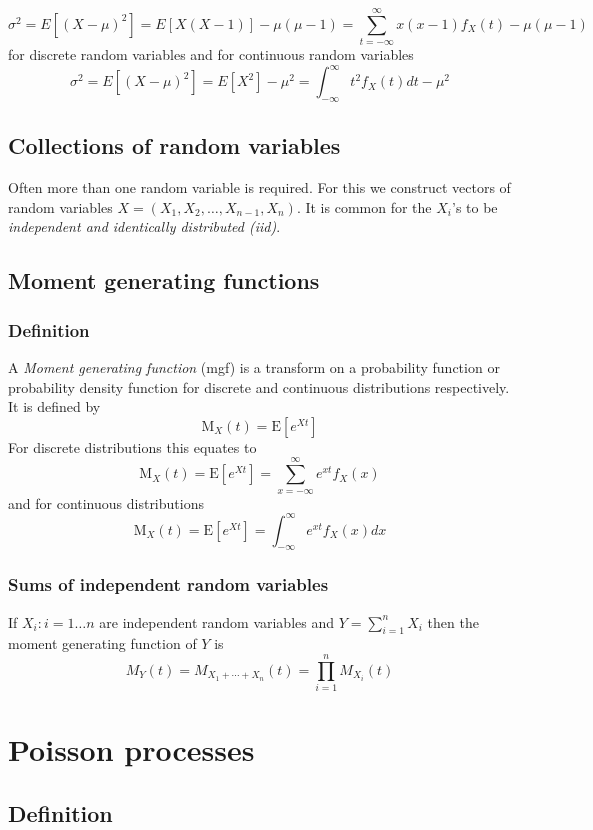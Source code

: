 \[ \sigma^2 = E[(X-\mu)^2] = E[X(X-1)] - \mu(\mu-1) = \sum_{t =
-\infty}^{\infty}{x(x-1) f_X(t)} - \mu(\mu-1) \]
for discrete random variables and for continuous random variables
\[ \sigma^2 = E[(X-\mu)^2] = E[X^2] - \mu^2 =
\int_{-\infty}^{\infty}{t^2 f_X(t) dt} - \mu^2 \]

\subsection{Collections of random variables}

Often more than one random variable is required.  For this we
construct vectors of random variables $X = (X_1, X_2, \ldots, X_{n-1},
X_n)$.  It is common for the $X_i$'s to be {\em independent and
identically distributed (iid)}.

\subsection{Moment generating functions}

\subsubsection{Definition}

A {\em Moment generating function} (mgf) is a transform on a
probability function or probability density function for discrete and
continuous distributions respectively.  It is defined by
\[ \mbox{M}_X(t) = \mbox{E}[e^{Xt}] \]
For discrete distributions this equates to
\[ \mbox{M}_X(t) = \mbox{E}[e^{Xt}] = \sum_{x =
-\infty}^{\infty}e^{xt}f_X(x) \]
and for continuous distributions
\[ \mbox{M}_X(t) = \mbox{E}[e^{Xt}] = \int_{-\infty}^{\infty}e^{xt}f_X(x) dx \]

\subsubsection{Sums of independent random variables}

If ${X_i : i = 1 \ldots n}$ are independent random variables and $Y =
\sum_{i = 1}^{n}{X_i}$ then the moment generating function of $Y$ is
\[
M_Y(t) = M_{X_1 + \cdots + X_n}(t) = \prod_{i = 1}^{n}{M_{X_i}(t)}
\]

\section{Poisson processes}

\subsection{Definition}

